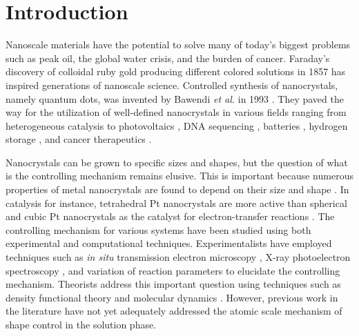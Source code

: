 
\section{Introduction}


Nanoscale materials have the potential to solve many of today's biggest problems such as peak oil, the global water crisis, and the burden of cancer.
Faraday's discovery of colloidal ruby gold producing different colored solutions in 1857 \cite{Faraday_1857,Thompson_2007} has inspired generations of nanoscale science.
Controlled synthesis of nanocrystals, namely quantum dots, was invented by Bawendi \textit{et al.} in 1993 \cite{hakimi1993quantum,Murray_2000}.
They paved the way for the utilization of well-defined nanocrystals in various fields ranging from heterogeneous catalysis \cite{astruc2008nanoparticles,Astruc_2006} to photovoltaics \cite{Atwater_2010}, DNA sequencing \cite{McNally_2010}, batteries \cite{Panniello_2014}, hydrogen storage \cite{Jena_2011,Ramos_Castillo_2015}, and cancer therapeutics \cite{Jain_2010,Kim_2010}.

Nanocrystals can be grown to specific sizes and shapes, but the question of what is the controlling mechanism remains elusive.
This is important because numerous properties of metal nanocrystals are found to depend on their size \cite{Roduner_2006} and shape \cite{Xia_2008}.
In catalysis for instance, tetrahedral Pt nanocrystals are more active than spherical and cubic Pt nanocrystals as the catalyst for electron-transfer reactions \cite{Narayanan_2005}.
The controlling mechanism for various systems have been studied using both experimental and computational techniques.
Experimentalists have employed techniques such as \textit{in situ} transmission electron microscopy \cite{Liao_2014,Woehl_2014}, X-ray photoelectron spectroscopy \cite{Gao_2004,Park_2014,Huang_1996,Kedia_2012,Bonet_2000}, and variation of reaction parameters \cite{Personick_2013,Xia_2012,Zeng_2010,Zhang_1996,Chang_2011,Zhu_2011} to elucidate the controlling mechanism.
Theorists address this important question using techniques such as density functional theory \cite{Kilin_2008,Al_Saidi_2012,Saidi_2013,Zhang_2008} and molecular dynamics \cite{Zhou_2014}.
However, previous work in the literature have not yet adequately addressed the atomic scale mechanism of shape control in the solution phase.
  